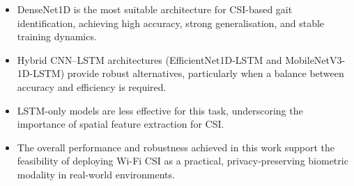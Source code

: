 \begin{itemize}
    \item DenseNet1D is the most suitable architecture for CSI-based
    gait identification, achieving high accuracy, strong generalisation,
    and stable training dynamics.

    \item Hybrid CNN--LSTM architectures (EfficientNet1D-LSTM and
    MobileNetV3-1D-LSTM) provide robust alternatives, particularly when a
    balance between accuracy and efficiency is required.

    \item LSTM-only models are less effective for this task, underscoring
    the importance of spatial feature extraction for CSI.

    \item The overall performance and robustness achieved in this work
    support the feasibility of deploying Wi-Fi CSI as a practical,
    privacy-preserving biometric modality in real-world environments.
\end{itemize}
